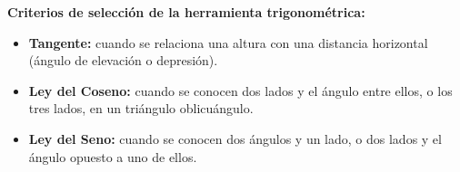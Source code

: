 \documentclass[11pt, letterpaper]{article}
\begin{document}
\vspace{1em}
\noindent\textbf{Criterios de selección de la herramienta trigonométrica:}

\begin{itemize}[leftmargin=1.5em]
  \item \textbf{Tangente:} cuando se relaciona una altura con una distancia horizontal (ángulo de elevación o depresión).
  \item \textbf{Ley del Coseno:} cuando se conocen dos lados y el ángulo entre ellos, o los tres lados, en un triángulo oblicuángulo.
  \item \textbf{Ley del Seno:} cuando se conocen dos ángulos y un lado, o dos lados y el ángulo opuesto a uno de ellos.
\end{itemize}
\end{document}
